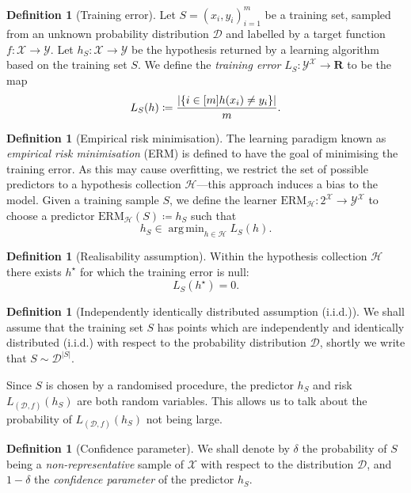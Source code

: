 \documentclass[11pt, reqno]{amsart}
\theoremstyle{definition}
\newtheorem{definition}[theorem]{Definition}
\let\colon\relax
\newcommand{\R}{\mathbf{R}}
\DeclareMathOperator*{\argmin}{arg\,min}
\begin{document}
\begin{definition}[Training error]
\label{def:training-error}
Let \(S = (x_i, y_i)_{i=1}^m\) be a training set, sampled from an unknown
probability distribution \(\mathcal{D}\) and labelled by a target function
\(f: \mathcal{X} \to \mathcal{Y}\). Let \(h_S: \mathcal{X} \to \mathcal{Y}\) be the hypothesis returned by a learning
algorithm based on the training set \(S\). We define the \emph{training error}
\(L_S: \mathcal{Y}^{\mathcal{X}} \to \R\) to be the map
\[
L_S(h) \coloneq \frac{|\{i \in [m] \colon h(x_i) \neq y_i\}|}{m}.
\]
\end{definition}

\begin{definition}[Empirical risk minimisation]
\label{def:empirical-risk-minimisation}
The learning paradigm known as \emph{empirical risk minimisation}
(ERM) is defined to have the goal of minimising the training
error. As this may cause overfitting, we restrict the set of possible predictors
to a hypothesis collection \(\mathcal{H}\)---this approach induces a bias to the
model. Given a training sample \(S\), we define the learner
\(\text{ERM}_{\mathcal{H}}: 2^{\mathcal{X}} \to \mathcal{Y}^{\mathcal{X}}\) to
choose a predictor \(\text{ERM}_{\mathcal{H}}(S) \coloneq h_S\) such that
\[
h_S \in \argmin_{h \in \mathcal{H}} L_S(h).
\]
\end{definition}

\begin{definition}[Realisability assumption]
\label{def:realisability-assumption}
Within the hypothesis collection \(\mathcal{H}\) there exists \(h^{\star}\) for
which the training error is null:
\[
L_S(h^{\star}) = 0.
\]
\end{definition}

\begin{definition}[Independently identically distributed assumption (i.i.d.)]
\label{def:iid-assumption}
We shall assume that the training set \(S\) has points which are independently
and identically distributed (i.i.d.) with respect to the probability distribution
\(\mathcal{D}\), shortly we write that \(S \sim \mathcal{D}^{|S|}\).
\end{definition}

Since \(S\) is chosen by a randomised procedure, the predictor \(h_S\) and risk
\(L_{(\mathcal{D}, f)}(h_S)\) are both random variables. This allows us to talk
about the probability of \(L_{(\mathcal{D}, f)}(h_S)\) not being large.

\begin{definition}[Confidence parameter]
\label{def:confidence-parameter}
We shall denote by \(\delta\) the probability of \(S\) being a
\emph{non-representative} sample of \(\mathcal{X}\) with respect to the
distribution \(\mathcal{D}\), and \(1 - \delta\) the \emph{confidence parameter}
of the predictor \(h_S\).
\end{definition}
\end{document}
